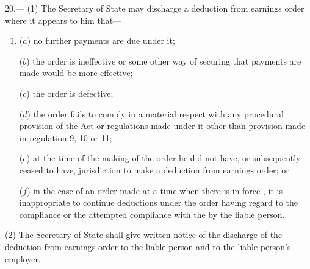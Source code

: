 \documentclass[12pt,a4paper]{article}
\begin{document}
20.—%
%
%
(1) The Secretary of State may discharge a deduction from earnings order where it appears to him that—
\begin{enumerate}\item[]
($a$) no further payments are due under it;

($b$) the order is ineffective or some other way of securing that payments are made would be more effective;

($c$) the order is defective;

($d$) the order fails to comply in a material respect with any procedural provision of the Act or regulations made under it other than provision made in regulation 9, 10 or 11;

($e$) at the time of the making of the order he did not have, or subsequently ceased to have, jurisdiction to make a deduction from earnings order; or

($f$) in the case of an order made at a time when there is in force 
,  %
it is inappropriate to continue deductions under the order having regard to the compliance or the attempted compliance with the 
by the liable person.
\end{enumerate}


(2) The Secretary of State shall give written notice of the discharge of the deduction from earnings order to the liable person and to the liable person’s employer.

\end{document}
